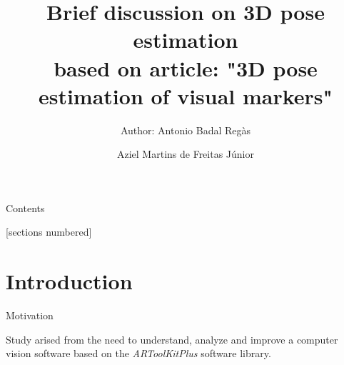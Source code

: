 \documentclass[10pt]{beamer}
\title{Brief discussion on 3D pose estimation\\
based on article: "3D pose estimation of visual markers"}
\subtitle{Author: Antonio Badal Regàs}
\date{}
\author{Aziel Martins de Freitas Júnior}
\institute{SENAI CIMATEC}
\begin{document}
\maketitle


\begin{frame}{Contents}

  [sections numbered]
  \tableofcontents%

\end{frame}

\section[Introduction]{Introduction}


\begin{frame}[fragile]{Motivation}

  Study arised from the need to understand, analyze and improve a computer vision software based on the \emph{ARToolKitPlus} software library.

\end{frame}

\end{document}
